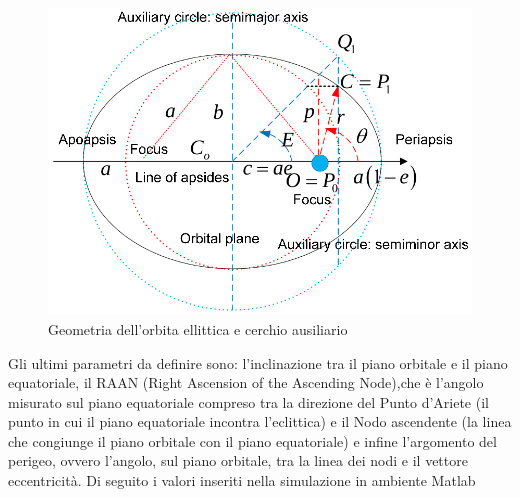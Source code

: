 \begin{figure}[htp]
\begin{center}
  \includegraphics[width=\textwidth]{modelling/orbit_dynamics/image/cerchio_ausiliario.png}
  \caption{Geometria dell'orbita ellittica e cerchio ausiliario}
  \label{fig:cerchio_ausiliario}
\end{center}
\end{figure}

Gli ultimi parametri da definire sono: l'inclinazione tra il piano orbitale e
il piano equatoriale, il RAAN (Right Ascension of the Ascending Node),che è
l'angolo misurato sul piano equatoriale compreso tra la direzione del Punto
d'Ariete (il punto in cui il piano equatoriale incontra l'eclittica) e il Nodo
ascendente (la linea che congiunge il piano orbitale con il piano equatoriale) e
infine l'argomento del perigeo, ovvero l'angolo, sul piano orbitale, tra la
linea dei nodi e il vettore eccentricità.
Di seguito i valori inseriti nella simulazione in ambiente Matlab
